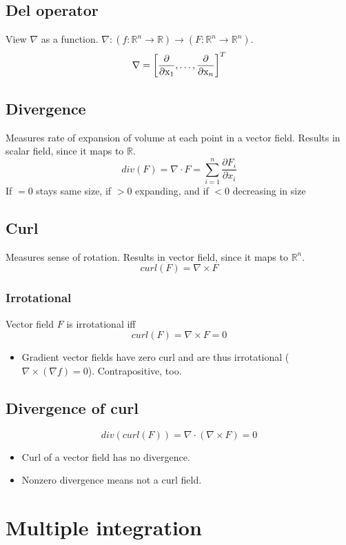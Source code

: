 \subsection*{Del operator}
View $\nabla$ as a function. $\nabla: (f:\mathbb{R}^n\to \mathbb{R}) \to (F:\mathbb{R}^n\to\mathbb{R}^n)$.
$$\nabla = \left[\frac{\partial}{\partial\textrm{x}_1}, \ldots, \frac{\partial}{\partial\textrm{x}_n}\right]^T$$

\subsection*{Divergence}
Measures rate of expansion of volume at each point in a vector field. Results in scalar field, since it maps to $\mathbb{R}$.
    $$div(F) = \nabla \cdot F = \sum_{i=1}^{n}\frac{\partial F_i}{\partial x_i}$$
    If $=0$ stays same size, if $>0$ expanding, and if $<0$ decreasing in size

\subsection*{Curl}
Measures sense of rotation. Results in vector field, since it maps to $\mathbb{R}^n$.
$$curl(F) = \nabla \times F$$
\subsubsection*{Irrotational}
Vector field $F$ is irrotational iff
$$curl(F) = \nabla \times F = 0$$
\begin{itemize}
    \item Gradient vector fields have zero curl and are thus  irrotational ($\nabla\times (\nabla f)=0$). Contrapositive, too.
\end{itemize}{}

\subsection*{Divergence of curl}
$$div(curl(F)) = \nabla \cdot (\nabla \times F) = 0$$
\begin{itemize}
    \item Curl of a vector field has no divergence.
    \item Nonzero divergence means not a curl field.
\end{itemize}{}

\section*{Multiple integration}
